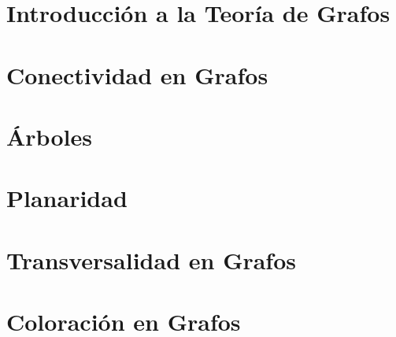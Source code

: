 \renewcommand{\contentsname}{Indice}
\tableofcontents
\newpage
\section{Introducción a la Teoría de Grafos}

\newpage
\section{Conectividad en Grafos}

\newpage
\section{Árboles}

\newpage
\section{Planaridad}

\newpage
\section{Transversalidad en Grafos}

\newpage
\section{Coloración en Grafos}
